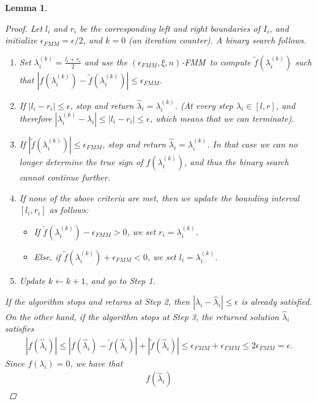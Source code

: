 \documentclass{article}
\newtheorem{lemma}{Lemma}[section]
\newcommand{\cfmm}{\xi}
\newcommand{\fmmalgo}{FMM} \usepackage[utf8]{inputenc}
\begin{document}
\begin{lemma}
\begin{proof}
        Let $l_i$ and $r_i$ be the corresponding left and right boundaries of $I_i$, and initialize $\epsilon_{FMM}=\epsilon/2$, and $k=0$ (an iteration counter). 
        A binary search follows.
        \begin{enumerate}
            \item Set $\lambda_i^{(k)}=\frac{l_i+r_i}{2}$ and use the $(\epsilon_{FMM},\cfmm,n)$-\fmmalgo\   to compute $\widetilde f(\lambda_i^{(k)})$ such that $|f(\lambda_i^{(k)})-\widetilde f(\lambda_i^{(k)})|\leq \epsilon_{FMM}$.
            \item If $|l_i-r_i| \leq \epsilon$, stop and return $\widehat\lambda_i=\lambda_i^{(k)}$. (At every step $\lambda_i\in[l,r]$, and therefore $|\lambda_i^{(k)}-\lambda_i|\leq |l_i-r_i|\leq \epsilon$, which means that we can terminate).
            \item If $|\widetilde f(\lambda_i^{(k)})| \leq \epsilon_{FMM}$, stop and return $\widehat\lambda_i=\lambda_i^{(k)}$. In that case we can no longer determine the true sign of $f(\lambda_i^{(k)})$, and thus the binary search cannot continue further.
            \item If none of the above criteria are met, then we update the bounding interval $[l_i,r_i]$ as follows:
            \begin{itemize}
                \item If $\widetilde f(\lambda_i^{(k)})-\epsilon_{FMM}>0$, we set $r_i=\lambda_{i}^{(k)}$.
                \item Else, if $\widetilde f(\lambda_i^{(k)})+\epsilon_{FMM}<0$, we set $l_i=\lambda_i^{(k)}$.
            \end{itemize}
            \item Update $k\leftarrow k+1$, and go to Step 1.
        \end{enumerate}
        If the algorithm stops and returns at Step 2, then $|\lambda_i-\widehat\lambda_i|\leq \epsilon$ is already satisfied. 
        On the other hand, if the algorithm stops at Step 3,
        the returned solution $\widehat\lambda_i$ satisfies
        \begin{align*}
            |f(\widehat\lambda_i)| \leq |f(\widehat\lambda_i)-\widetilde f(\widehat\lambda_i)| + |\widetilde f(\widehat\lambda_i)|
            \leq \epsilon_{FMM} + \epsilon_{FMM} \leq 2\epsilon_{FMM} = \epsilon.
        \end{align*}
        Since $f(\lambda_i)=0$, we have that
        \begin{align*}
            f(\widehat\lambda_i) 

\end{align*}
\end{proof}
\end{lemma}
\end{document}
